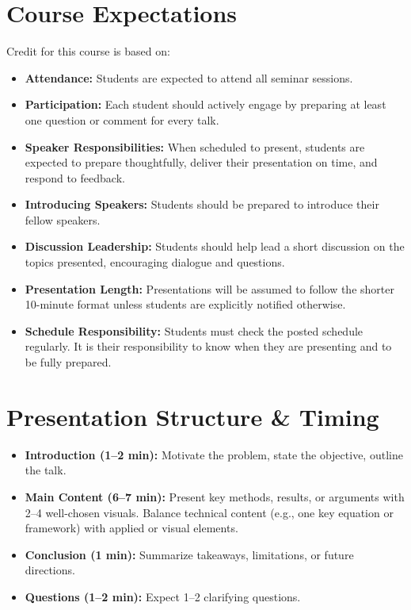 \documentclass[11pt]{article}
\begin{document}
\section*{Course Expectations}
Credit for this course is based on:
\begin{itemize}
    \item \textbf{Attendance:} Students are expected to attend all seminar sessions.
    \item \textbf{Participation:} Each student should actively engage by preparing at least one question or comment for every talk.
    \item \textbf{Speaker Responsibilities:} When scheduled to present, students are expected to prepare thoughtfully, deliver their presentation on time, and respond to feedback.
    \item \textbf{Introducing Speakers:} Students should be prepared to introduce their fellow speakers.
    \item \textbf{Discussion Leadership:} Students should help lead a short discussion on the topics presented, encouraging dialogue and questions.
    \item \textbf{Presentation Length:} Presentations will be assumed to follow the shorter 10-minute format unless students are explicitly notified otherwise.
    \item \textbf{Schedule Responsibility:} Students must check the posted schedule regularly. It is their responsibility to know when they are presenting and to be fully prepared.
\end{itemize}

\section*{Presentation Structure \& Timing}
\begin{itemize}
    \item \textbf{Introduction (1--2 min):} Motivate the problem, state the objective, outline the talk.
    \item \textbf{Main Content (6--7 min):} Present key methods, results, or arguments with 2--4 well-chosen visuals. Balance technical content (e.g., one key equation or framework) with applied or visual elements.
    \item \textbf{Conclusion (1 min):} Summarize takeaways, limitations, or future directions.
    \item \textbf{Questions (1--2 min):} Expect 1--2 clarifying questions.
\end{itemize}
\end{document}
